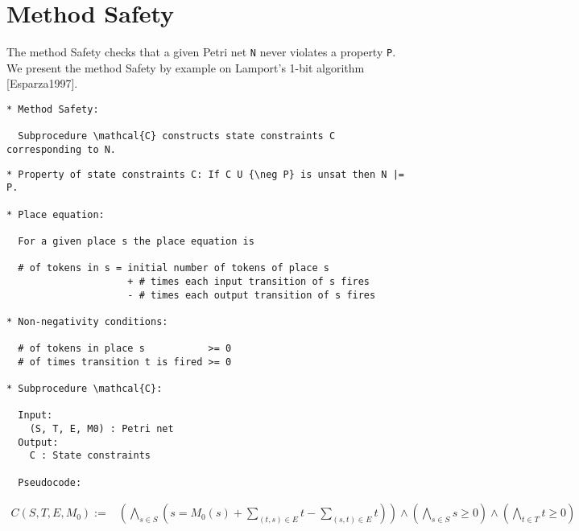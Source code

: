 \documentclass{llncs}
\begin{document}




\newpage
\section{Method Safety}

The method Safety checks that a given Petri net \verb=N= never violates a property \verb=P=.
We present the method Safety by example on Lamport's 1-bit algorithm [Esparza1997].

\begin{verbatim}
* Method Safety:

  Subprocedure \mathcal{C} constructs state constraints C corresponding to N.
\end{verbatim}





\begin{verbatim}
* Property of state constraints C: If C U {\neg P} is unsat then N |= P.

* Place equation:
  
  For a given place s the place equation is

  # of tokens in s = initial number of tokens of place s
                     + # times each input transition of s fires
                     - # times each output transition of s fires

* Non-negativity conditions:

  # of tokens in place s           >= 0
  # of times transition t is fired >= 0

* Subprocedure \mathcal{C}:

  Input:
    (S, T, E, M0) : Petri net
  Output:
    C : State constraints

  Pseudocode:

\end{verbatim}

\begin{align*}
  C(S, T, E, M_0) :=& \left( \bigwedge_{s \in S} \left(
    s = M_0(s) + \sum_{(t, s) \in E} t - \sum_{(s, t) \in E} t
  \right) \right) \land
    \left( \bigwedge_{s \in S} s \ge 0 \right) \land
    \left( \bigwedge_{t \in T} t \ge 0 \right)
\end{align*}

\newpage
\end{document}
